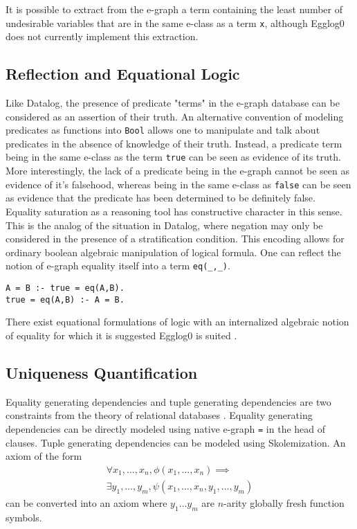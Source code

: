 \documentclass[sigplan,10pt,review]{acmart} %
\begin{document}
It is possible to extract from the e-graph a term containing the least number of undesirable variables that are in the same e-class as a term \lstinline{x}, although Egglog0 does not currently implement this extraction.

\subsection{Reflection and Equational Logic}
Like Datalog, the presence of predicate "terms" in the e-graph database can be considered as an assertion of their truth. An alternative convention of modeling predicates as functions into \lstinline{Bool} allows one to manipulate and talk about predicates in the absence of knowledge of their truth. Instead, a predicate term being in the same e-class as the term \lstinline{true} can be seen as evidence of its truth. More interestingly, the lack of a predicate being in the e-graph cannot be seen as evidence of it's falsehood, whereas being in the same e-class as \lstinline{false} can be seen as evidence that the predicate has been determined to be definitely false. Equality saturation as a reasoning tool has constructive character in this sense. This is the analog of the situation in Datalog, where negation may only be considered in the presence of a stratification condition.
This encoding allows for ordinary boolean algebraic manipulation of logical formula.
One can reflect the notion of e-graph equality itself into a term \lstinline{eq(_,_)}.

\begin{lstlisting}
A = B :- true = eq(A,B).
true = eq(A,B) :- A = B.

\end{lstlisting}
There exist equational formulations of logic with an internalized algebraic notion of equality for which it is suggested Egglog0 is suited \cite{Dijkstra1990, Gries1993}.

\subsection{Uniqueness Quantification}
Equality generating dependencies and tuple generating dependencies are two constraints from the theory of relational databases \cite{databases}.
Equality generating dependencies can be directly modeled using native e-graph \lstinline{=} in the head of clauses.
Tuple generating dependencies can be modeled using Skolemization.
An axiom of the form \begin{equation}
\begin{split}
\forall x_1, \ldots, x_n, \phi(x_1, \ldots , x_n) \implies \\
 \exists y_1, \ldots, y_m,  \psi(x_1,\ldots,x_n, y_1,\ldots, y_m) 
\end{split} \end{equation}
can be converted into an axiom where $y_1 \ldots y_m$ are $n$-arity globally fresh function symbols.
\end{document}
